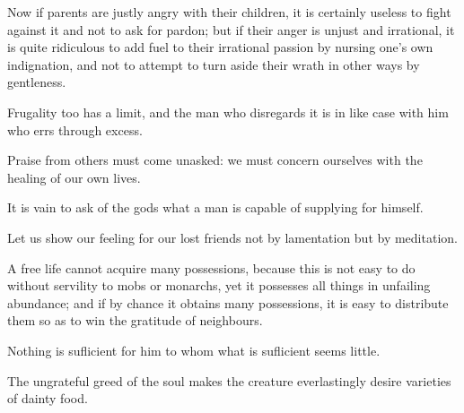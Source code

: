 \documentclass{stex}
\begin{document}
\vspace{0.5em}
\begin{sparagraph}[title=62]
  Now if parents are justly angry with their children, it is certainly useless to fight against it and not to ask for pardon; but if their anger is unjust and irrational, it is quite ridiculous to add fuel to their irrational passion by nursing one’s own indignation, and not to attempt to turn aside their wrath in other ways by gentleness.
\end{sparagraph}
\vspace{0.5em}
\begin{sparagraph}[title=63]
  Frugality too has a limit, and the man who disregards it is in like case with him who errs through excess.
\end{sparagraph}
\vspace{0.5em}
\begin{sparagraph}[title=64]
  Praise from others must come unasked: we must concern ourselves with the healing of our own lives.
\end{sparagraph}
\vspace{0.5em}
\begin{sparagraph}[title=65]
  It is vain to ask of the gods what a man is capable of supplying for himself.
\end{sparagraph}
\vspace{0.5em}
\begin{sparagraph}[title=66]
  Let us show our feeling for our lost friends not by lamentation but by meditation.
\end{sparagraph}
\vspace{0.5em}
\begin{sparagraph}[title=67]
  A free life cannot acquire many possessions, because this is not easy to do without servility to mobs or monarchs, yet it possesses all things in unfailing abundance; and if by chance it obtains many possessions, it is easy to distribute them so as to win the gratitude of neighbours.
\end{sparagraph}
\vspace{0.5em}
\begin{sparagraph}[title=68]
  Nothing is suflicient for him to whom what is suflicient seems little.
\end{sparagraph}
\vspace{0.5em}
\begin{sparagraph}[title=69]
  The ungrateful greed of the soul makes the creature everlastingly desire varieties of dainty food.
\end{sparagraph}
\end{document}

